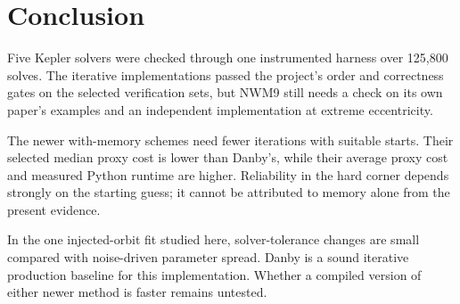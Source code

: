 \documentclass[11pt,a4paper]{article}
\begin{document}
\section{Conclusion}

Five Kepler solvers were checked through one instrumented harness over
125{,}800 solves. The iterative implementations passed the project's
order and correctness gates on the selected verification sets, but NWM9
still needs a check on its own paper's examples and an independent
implementation at extreme eccentricity.

The newer with-memory schemes need fewer iterations with suitable
starts. Their selected median proxy cost is lower than Danby's, while
their average proxy cost and measured Python runtime are higher.
Reliability in the hard corner depends strongly on the starting guess;
it cannot be attributed to memory alone from the present evidence.

In the one injected-orbit fit studied here, solver-tolerance changes are
small compared with noise-driven parameter spread. Danby is a sound
iterative production baseline for this implementation. Whether a
compiled version of either newer method is faster remains untested.

\clearpage
\end{document}
